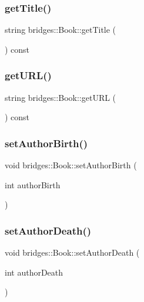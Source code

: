 \subsubsection{\texorpdfstring{get\+Title()}{getTitle()}}
{\footnotesize\ttfamily string bridges\+::\+Book\+::get\+Title (\begin{DoxyParamCaption}{ }\end{DoxyParamCaption}) const\hspace{0.3cm}{\ttfamily [inline]}}

\mbox{\label{classbridges_1_1_book_a3facf86f7560e974ec7cd81e0fc58800}} 
\subsubsection{\texorpdfstring{get\+U\+R\+L()}{getURL()}}
{\footnotesize\ttfamily string bridges\+::\+Book\+::get\+U\+RL (\begin{DoxyParamCaption}{ }\end{DoxyParamCaption}) const\hspace{0.3cm}{\ttfamily [inline]}}

\mbox{\label{classbridges_1_1_book_adca4d6766fa0068e23926ae95ed8411f}} 
\subsubsection{\texorpdfstring{set\+Author\+Birth()}{setAuthorBirth()}}
{\footnotesize\ttfamily void bridges\+::\+Book\+::set\+Author\+Birth (\begin{DoxyParamCaption}\item[{int}]{author\+Birth }\end{DoxyParamCaption})\hspace{0.3cm}{\ttfamily [inline]}}

\mbox{\label{classbridges_1_1_book_a044ad1b1b6418d7545c6f957b2757bcd}} 
\subsubsection{\texorpdfstring{set\+Author\+Death()}{setAuthorDeath()}}
{\footnotesize\ttfamily void bridges\+::\+Book\+::set\+Author\+Death (\begin{DoxyParamCaption}\item[{int}]{author\+Death }\end{DoxyParamCaption})\hspace{0.3cm}{\ttfamily [inline]}}


